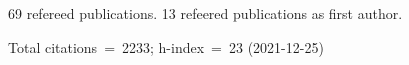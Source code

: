 69 refereed publications. 13 refeered publications as first author.

Total citations~=~2233; h-index~=~23 (2021-12-25)